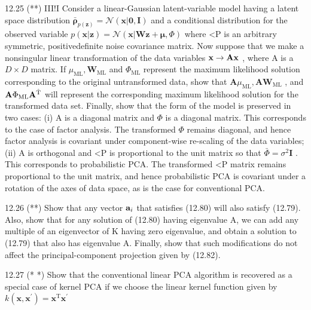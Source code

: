 \documentclass[
  10
]{article}
\begin{document}
12.25 (**) III!I Consider a linear-Gaussian latent-variable model having
a latent space distribution
\(\mathbf { \bar { \rho } } _ { p ( \mathbf { z } ) } = \mathcal { N } ( \mathbf { x } | \mathbf { 0 } , \mathbf { I } )\)
and a conditional distribution for the observed variable
\(p ( \mathbf { x } | \mathbf { z } ) = \mathcal { N } ( \mathbf { x } | \mathbf { W } \mathbf { z } + \pmb { \mu } , \Phi )\)
where \textless P is an arbitrary symmetric, positivedefinite noise
covariance matrix. Now suppose that we make a nonsingular linear
transformation of the data variables \(\bf { x } \to \bf { A x }\) ,
where A is a \(D \times D\) matrix. If
\(\mu _ { \mathrm { M L } } , \mathbf { W } _ { \mathrm { M L } }\) and
\(\Phi _ { \mathrm { M L } }\) represent the maximum likelihood solution
corresponding to the original untransformed data, show that
\(\mathbf { A } \mu _ { \mathrm { M L } } , \mathbf { A W } _ { \mathrm { M L } }\)
, and
\({ \bf A } \Phi _ { \mathrm { M L } } { \bf A } ^ { \mathrm { \hat { T } } }\)
will represent the corresponding maximum likelihood solution for the
transformed data set. Finally, show that the form of the model is
preserved in two cases: (i) A is a diagonal matrix and \(\Phi\) is a
diagonal matrix. This corresponds to the case of factor analysis. The
transformed \(\Phi\) remains diagonal, and hence factor analysis is
covariant under component-wise re-scaling of the data variables; (ii) A
is orthogonal and \textless P is proportional to the unit matrix so that
\(\bar { \Phi } = \sigma ^ { 2 } \mathbf { I }\) . This corresponds to
probabilistic PCA. The transformed \textless P matrix remains
proportional to the unit matrix, and hence probabilistic PCA is
covariant under a rotation of the axes of data space, as is the case for
conventional PCA.

12.26 (**) Show that any vector \({ \bf a } _ { i }\) that satisfies
(12.80) will also satisfy (12.79). Also, show that for any solution of
(12.80) having eigenvalue A, we can add any multiple of an eigenvector
of K having zero eigenvalue, and obtain a solution to (12.79) that also
has eigenvalue A. Finally, show that such modifications do not affect
the principal-component projection given by (12.82).

12.27 (* *) Show that the conventional linear PCA algorithm is recovered
as a special case of kernel PCA if we choose the linear kernel function
given by
\(k ( \mathbf { x } , \mathbf { x } ^ { \prime } ) = \mathbf { x } ^ { \mathrm { { T } } } \mathbf { x } ^ { \prime }\)
\end{document}
